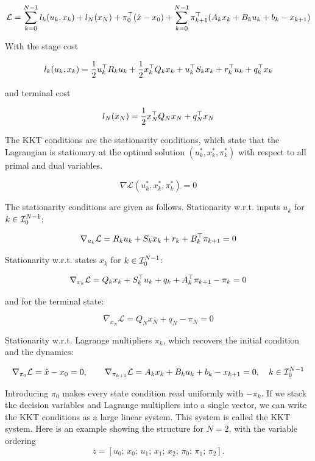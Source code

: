 \[
\mathcal{L} = \sum_{k=0}^{N-1} l_k(u_k, x_k) + l_N(x_N) + \pi_0^\top (\hat{x} - x_0) + \sum_{k=0}^{N-1} \pi_{k+1}^\top (A_k x_k + B_k u_k + b_k - x_{k+1})
\]

With the stage cost

\[
l_k(u_k, x_k) = \frac{1}{2} u_k^\top R_k u_k + \frac{1}{2} x_k^\top Q_k x_k + u_k^\top S_k x_k + r_k^\top u_k + q_k^\top x_k
\]

and terminal cost

\[
l_N(x_N) = \frac{1}{2} x_N^\top Q_N x_N + q_N^\top x_N
\]

The KKT conditions are the stationarity conditions, which state that the Lagrangian is stationary at the optimal solution $(u_k^*, x_k^*, \pi_k^*)$ with respect to all primal and dual variables.

\[
\nabla \mathcal{L}(u_k^*, x_k^*, \pi_k^*) = 0
\]

The stationarity conditions are given as follows.
Stationarity w.r.t. inputs $u_k$ for $k\in\mathcal{I}_{0}^{N-1}$:

\[ 
\nabla_{u_k} \mathcal{L} = R_k u_k + S_k x_k + r_k + B_k^\top \pi_{k+1} = 0
\]

Stationarity w.r.t. states $x_k$ for $k\in\mathcal{I}_{0}^{N-1}$:

\[
\nabla_{x_k} \mathcal{L} = Q_k x_k + S_k^\top u_k + q_k + A_k^\top \pi_{k+1} - \pi_k = 0
\]

and for the terminal state:

\[
\nabla_{x_N} \mathcal{L} = Q_N x_N + q_N - \pi_N = 0
\]

Stationarity w.r.t. Lagrange multipliers $\pi_k$, which recovers the initial condition and the dynamics:

\[
\nabla_{\pi_0} \mathcal{L} = \hat{x} - x_0 = 0, \qquad
\nabla_{\pi_{k+1}} \mathcal{L} = A_k x_k + B_k u_k + b_k - x_{k+1} = 0, \quad k\in\mathcal{I}_{0}^{N-1}
\]

Introducing $\pi_0$ makes every state condition read uniformly with $-\pi_k$.
If we stack the decision variables and Lagrange multipliers into a single vector, we can write the KKT conditions as a large linear system.
This system is called the KKT system.
Here is an example showing the structure for $N=2$, with the variable ordering
\[
z = [u_0;\, x_0;\, u_1;\, x_1;\, x_2;\, \pi_0;\, \pi_1;\, \pi_2].
\]

